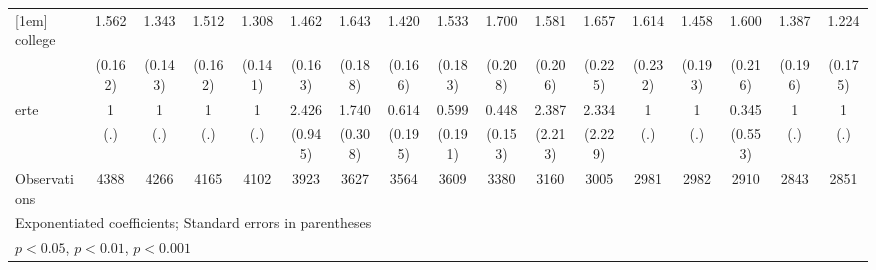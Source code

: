 {\begin{tabular}{l*{16}{c}}
[1em]
college             &       1.562\sym{***}&       1.343\sym{**} &       1.512\sym{***}&       1.308\sym{*}  &       1.462\sym{***}&       1.643\sym{***}&       1.420\sym{**} &       1.533\sym{***}&       1.700\sym{***}&       1.581\sym{***}&       1.657\sym{***}&       1.614\sym{***}&       1.458\sym{**} &       1.600\sym{***}&       1.387\sym{*}  &       1.224         \\
                    &     (0.162)         &     (0.143)         &     (0.162)         &     (0.141)         &     (0.163)         &     (0.188)         &     (0.166)         &     (0.183)         &     (0.208)         &     (0.206)         &     (0.225)         &     (0.232)         &     (0.193)         &     (0.216)         &     (0.196)         &     (0.175)         \\
[1em]
erte                &           1         &           1         &           1         &           1         &       2.426\sym{*}  &       1.740\sym{**} &       0.614         &       0.599         &       0.448\sym{*}  &       2.387         &       2.334         &           1         &           1         &       0.345         &           1         &           1         \\
                    &         (.)         &         (.)         &         (.)         &         (.)         &     (0.945)         &     (0.308)         &     (0.195)         &     (0.191)         &     (0.153)         &     (2.213)         &     (2.229)         &         (.)         &         (.)         &     (0.553)         &         (.)         &         (.)         \\
\hline
Observations        &        4388         &        4266         &        4165         &        4102         &        3923         &        3627         &        3564         &        3609         &        3380         &        3160         &        3005         &        2981         &        2982         &        2910         &        2843         &        2851         \\
\hline\hline
\multicolumn{17}{l}{\footnotesize Exponentiated coefficients; Standard errors in parentheses}\\
\multicolumn{17}{l}{\footnotesize \sym{*} \(p<0.05\), \sym{**} \(p<0.01\), \sym{***} \(p<0.001\)}\\
\end{tabular}
}
